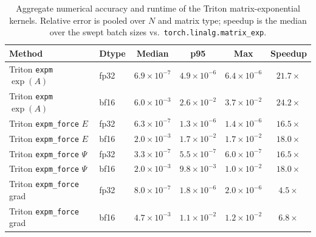 \begin{table}[h]
\centering
\caption{Aggregate numerical accuracy and runtime of the Triton matrix-exponential kernels. Relative error is pooled over $N$ and matrix type; speedup is the median over the swept batch sizes vs.\ \texttt{torch.linalg.matrix\_exp}.}
\label{tab:accuracy_summary}
\begin{tabular}{llcccc}
\toprule
Method & Dtype & Median & p95 & Max & Speedup \\
\midrule
Triton \texttt{expm} $\exp(A)$ & fp32 & $6.9{\times}10^{-7}$ & $4.9{\times}10^{-6}$ & $6.4{\times}10^{-6}$ & $21.7{\times}$ \\
Triton \texttt{expm} $\exp(A)$ & bf16 & $6.0{\times}10^{-3}$ & $2.6{\times}10^{-2}$ & $3.7{\times}10^{-2}$ & $24.2{\times}$ \\
Triton \texttt{expm\_force} $E$ & fp32 & $6.3{\times}10^{-7}$ & $1.3{\times}10^{-6}$ & $1.4{\times}10^{-6}$ & $16.5{\times}$ \\
Triton \texttt{expm\_force} $E$ & bf16 & $2.0{\times}10^{-3}$ & $1.7{\times}10^{-2}$ & $1.7{\times}10^{-2}$ & $18.0{\times}$ \\
Triton \texttt{expm\_force} $\Psi$ & fp32 & $3.3{\times}10^{-7}$ & $5.5{\times}10^{-7}$ & $6.0{\times}10^{-7}$ & $16.5{\times}$ \\
Triton \texttt{expm\_force} $\Psi$ & bf16 & $2.0{\times}10^{-3}$ & $9.8{\times}10^{-3}$ & $1.0{\times}10^{-2}$ & $18.0{\times}$ \\
Triton \texttt{expm\_force} grad & fp32 & $8.0{\times}10^{-7}$ & $1.8{\times}10^{-6}$ & $2.0{\times}10^{-6}$ & $4.5{\times}$ \\
Triton \texttt{expm\_force} grad & bf16 & $4.7{\times}10^{-3}$ & $1.1{\times}10^{-2}$ & $1.2{\times}10^{-2}$ & $6.8{\times}$ \\
\bottomrule
\end{tabular}
\end{table}
